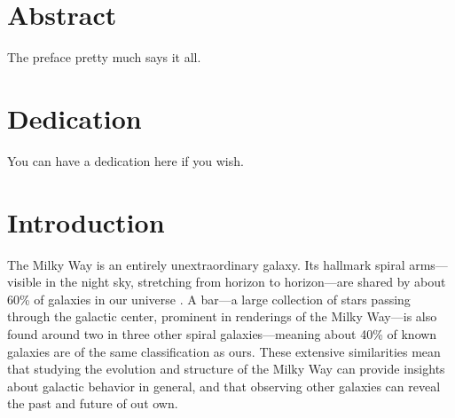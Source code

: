 \documentclass[12pt,twoside]{reedthesis}
\begin{document}
    \tableofcontents
    \listoftables
    \listoffigures

    \chapter*{Abstract}
	The preface pretty much says it all.

	\chapter*{Dedication}
	You can have a dedication here if you wish.

  \mainmatter %
  \pagestyle{fancyplain} %


    \chapter*{Introduction}


The Milky Way is an entirely unextraordinary galaxy. Its hallmark spiral arms---visible in the night sky, stretching from horizon to horizon---are shared by about 60\% of galaxies in our universe \citep{apm-bgc}. A bar---a large collection of stars passing through the galactic center, prominent in renderings of the Milky Way---is also found around two in three other spiral galaxies---meaning about 40\% of known galaxies are of the same classification as ours. These extensive similarities mean that studying the evolution and structure of the Milky Way can provide insights about galactic behavior in general, and that observing other galaxies can reveal the past and future of out own.
\end{document}

